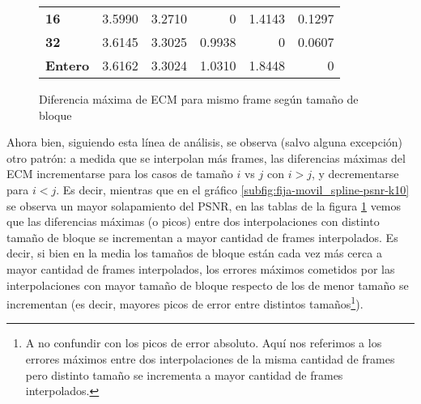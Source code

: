 \begin{figure}[H]
{\begin{tabular}{|l|r|r|r|r|r|}
            \textbf{16}&3.5990& 3.2710& 0& 1.4143& 0.1297\\
            \textbf{32}&3.6145& 3.3025& 0.9938& 0& 0.0607\\
            \textbf{Entero}&3.6162& 3.3024& 1.0310& 1.8448& 0\\
            \hline
        \end{tabular}
    }\hspace{10pt}
    \caption{Diferencia m\'axima de ECM para mismo frame seg\'un tama\~no de bloque}
    \label{fig:fija-movil-dif_ecm_splines}
\end{figure}


\par Ahora bien, siguiendo esta l\'inea de an\'alisis, se observa (salvo alguna
excepci\'on) otro patr\'on: a medida que se interpolan m\'as frames, las
diferencias m\'aximas del ECM incrementarse para los casos de tama\~no $i$ vs
$j$ con $i>j$, y decrementarse para $i<j$. Es decir, mientras que en el
gr\'afico \ref{subfig:fija-movil_spline-psnr-k10} se observa un mayor
solapamiento del PSNR, en las tablas de la figura
\ref{fig:fija-movil-dif_ecm_splines} vemos que las diferencias m\'aximas (o
picos) entre dos interpolaciones con distinto tama\~no de bloque se incrementan
a mayor cantidad de frames interpolados. Es decir, si bien en la media los
tama\~nos de bloque est\'an cada vez m\'as cerca a mayor cantidad de frames
interpolados, los errores m\'aximos cometidos por las interpolaciones con mayor
tama\~no de bloque respecto de los de menor tama\~no se incrementan (es decir,
mayores picos de error entre distintos tama\~nos\footnote{A no confundir con
los picos de error absoluto. Aqu\'i nos referimos a los errores m\'aximos entre
dos interpolaciones de la misma cantidad de frames pero distinto tama\~no se
incrementa a mayor cantidad de frames interpolados.}).

